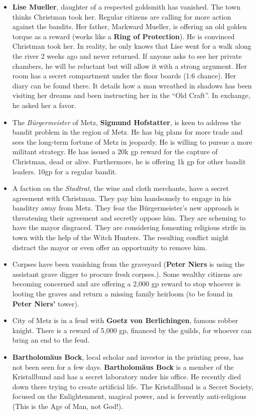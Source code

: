 \documentclass[
]{book}
\begin{document}
\begin{itemize}
\item
  \textbf{Lise Mueller}, daughter of a respected goldsmith has vanished. The town thinks Christman took her. Regular citizens are calling for more action against the bandits. Her father, Markward Mueller, is offering an old golden torque as a reward (works like a \textbf{Ring of Protection}). He is convinced Christman took her. In reality, he only knows that Lise went for a walk along the river 2 weeks ago and never returned. If anyone asks to see her private chambers, he will be reluctant but will allow it with a strong argument. Her room has a secret compartment under the floor boards (1:6 chance). Her diary can be found there. It details how a man wreathed in shadows has been visiting her dreams and been instructing her in the ``Old Craft''. In exchange, he asked her a favor.
\item
  The \emph{Bürgermeister} of Metz, \textbf{Sigmund Hofstatter}, is keen to address the bandit problem in the region of Metz. He has big plans for more trade and sees the long-term fortune of Metz in jeopardy. He is willing to pursue a more militant strategy. He has issued a 20k gp reward for the capture of Christman, dead or alive. Furthermore, he is offering 1k gp for other bandit leaders. 10gp for a regular bandit.
\item
  A faction on the \emph{Stadtrat}, the wine and cloth merchants, have a secret agreement with Christman. They pay him handsomely to engage in his banditry away from Metz. They fear the Bürgermeister's new approach is threatening their agreement and secretly oppose him. They are scheming to have the mayor disgraced. They are considering fomenting religious strife in town with the help of the Witch Hunters. The resulting conflict might distract the mayor or even offer an opportunity to remove him.
\item
  Corpses have been vanishing from the graveyard (\textbf{Peter Niers} is using the assistant grave digger to procure fresh corpses.). Some wealthy citizens are becoming concerned and are offering a 2,000 gp reward to stop whoever is looting the graves and return a missing family heirloom (to be found in \textbf{Peter Niers'} tower).
\item
  City of Metz is in a feud with \textbf{Goetz von Berlichingen}, famous robber knight. There is a reward of 5,000 gp, financed by the guilds, for whoever can bring an end to the feud.
\item
  \textbf{Bartholomäus Bock}, local scholar and investor in the printing press, has not been seen for a few days. \textbf{Bartholomäus Bock} is a member of the Kristallbund and has a secret laboratory under his office. He recently died down there trying to create artificial life. The Kristallbund is a Secret Society, focused on the Enlightenment, magical power, and is fervently anti-religious (This is the Age of Man, not God!).
\end{itemize}
\end{document}
